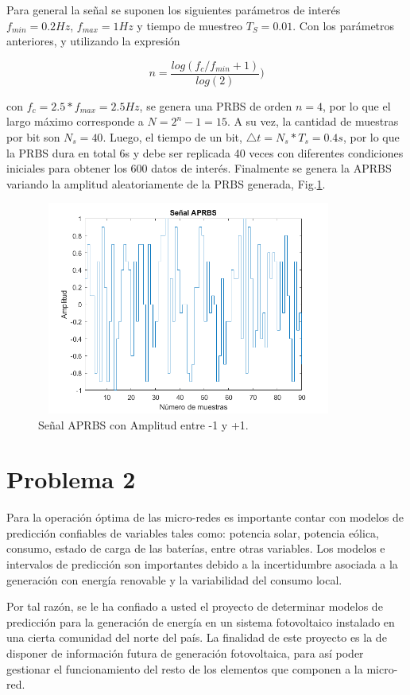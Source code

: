 \documentclass[12pt]{article}
\begin{document}
Para general la señal se suponen los siguientes parámetros de interés $f_{min}=0.2 Hz$, $f_{max}=1 Hz$ y tiempo de muestreo $T_S=0.01$. Con los parámetros anteriores, y utilizando la expresión

\begin{equation}
n=\frac{log(f_c/f_{min}+1)}{log(2)})
\label{e_}
\end{equation}

con $f_c=2.5*f_{max}=2.5 Hz$, se genera una PRBS de orden $n= 4$, por lo que el largo máximo corresponde a $N = 2^n - 1 = 15$. A su vez, la cantidad de muestras por bit son $N_{s} = 40$. Luego, el tiempo de un bit, $\triangle t=N_s*T_s=0.4s$, por lo que la PRBS dura en total 6s y debe ser replicada 40 veces con diferentes condiciones iniciales para obtener los 600 datos de interés. Finalmente se genera la APRBS variando la amplitud aleatoriamente de la PRBS generada, Fig.\ref{f_APRBS}.

\begin{figure}
\centering
\includegraphics[width=10cm,height=7cm]{imag/APRBS}
\caption{Señal APRBS con Amplitud entre -1 y +1.}
\label{f_APRBS}
\end{figure}


\section{Problema 2}
Para la operación óptima de las micro-redes es importante contar con modelos de predicción confiables de variables tales como: potencia solar, potencia eólica, consumo, estado de carga de las baterías, entre otras variables. Los modelos e intervalos de predicción son importantes debido a la incertidumbre asociada a la generación con energía renovable y la variabilidad del consumo local.

Por tal razón, se le ha confiado a usted el proyecto de determinar modelos de predicción para la generación de energía en un sistema fotovoltaico instalado en una cierta comunidad del norte del país. La finalidad de este proyecto es la de disponer de información futura de generación fotovoltaica, para así poder gestionar el funcionamiento del resto de los elementos que componen a la micro-red.
\end{document}
